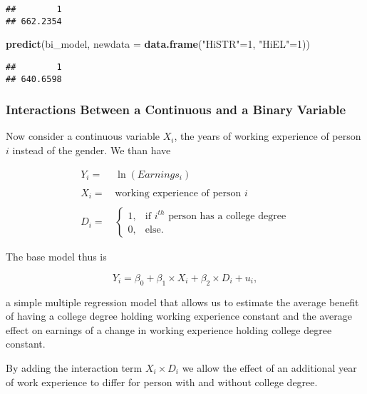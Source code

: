 \documentclass[]{book}
\newenvironment{Shaded}{\begin{snugshade}}{\end{snugshade}}
\newcommand{\KeywordTok}[1]{\textcolor[rgb]{0.13,0.29,0.53}{\textbf{#1}}}
\newcommand{\DataTypeTok}[1]{\textcolor[rgb]{0.13,0.29,0.53}{#1}}
\newcommand{\DecValTok}[1]{\textcolor[rgb]{0.00,0.00,0.81}{#1}}
\newcommand{\StringTok}[1]{\textcolor[rgb]{0.31,0.60,0.02}{#1}}
\newcommand{\NormalTok}[1]{#1}
\theoremstyle{definition}
\theoremstyle{definition}
\theoremstyle{definition}
\theoremstyle{remark}
\begin{document}
\begin{verbatim}
##        1 
## 662.2354
\end{verbatim}

\begin{Shaded}
\begin{Highlighting}[]
\KeywordTok{predict}\NormalTok{(bi_model, }\DataTypeTok{newdata =} \KeywordTok{data.frame}\NormalTok{(}\StringTok{"HiSTR"}\NormalTok{=}\DecValTok{1}\NormalTok{, }\StringTok{"HiEL"}\NormalTok{=}\DecValTok{1}\NormalTok{))}
\end{Highlighting}
\end{Shaded}

\begin{verbatim}
##        1 
## 640.6598
\end{verbatim}

\subsubsection*{Interactions Between a Continuous and a Binary
Variable}\label{interactions-between-a-continuous-and-a-binary-variable}

Now consider a continuous variable \(X_i\), the years of working
experience of person \(i\) instead of the gender. We than have

\begin{align*}
  Y_i =& \, \ln(Earnings_i) \\
  \\
  X_i =& \, \text{working experience of person }i \\
  \\
  D_i =& \,  
    \begin{cases}
      1, & \text{if $i^{th}$ person has a college degree} \\
      0, & \text{else}.
    \end{cases}
\end{align*}

The base model thus is

\[ Y_i = \beta_0 + \beta_1 \times X_i + \beta_2 \times D_i + u_i, \]

a simple multiple regression model that allows us to estimate the
average benefit of having a college degree holding working experience
constant and the average effect on earnings of a change in working
experience holding college degree constant.

By adding the interaction term \(X_i \times D_i\) we allow the effect of
an additional year of work experience to differ for person with and
without college degree.
\end{document}
